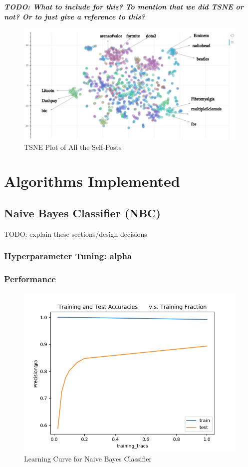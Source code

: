 \documentclass{sig-alternate-05-2015}
\begin{document}
\textit{\textbf{TODO: What to include for this? To mention that we did TSNE or not? Or to just give a reference to this?}}

\begin{figure}[H]
\centering
\includegraphics[width=\linewidth]{plots/tsne.png}
\caption{TSNE Plot of All the Self-Posts}
\end{figure}

\section{Algorithms Implemented}

\subsection{Naive Bayes Classifier (NBC)}

TODO: explain these sections/design decisions

\subsubsection{Hyperparameter Tuning: alpha}

\subsubsection{Performance}
\begin{figure}[H]
\centering
\includegraphics[width=\linewidth]{plots/learning_curve_nbc.png}
\caption{Learning Curve for Naive Bayes Classifier}
\end{figure}
\end{document}
